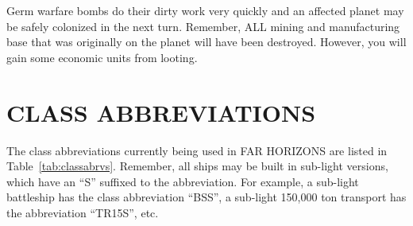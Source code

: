 \documentclass[10pt,titlepage]{article}
\begin{document}
Germ warfare bombs do their dirty work very quickly and an affected planet may
be safely colonized in the next turn.  Remember, ALL mining and manufacturing
base that was originally on the planet will have been destroyed.  However, you
will gain some economic units from looting.

\newpage
\section{CLASS ABBREVIATIONS}

The class abbreviations currently being used in FAR HORIZONS are listed in Table~\ref{tab:classabrvs}. 
Remember, all ships may be built in sub-light versions, which have an ``S''
suffixed to the abbreviation.  For example, a sub-light battleship has the
class abbreviation ``BSS'', a sub-light 150,000 ton transport has the
abbreviation ``TR15S'', etc.
\end{document}

